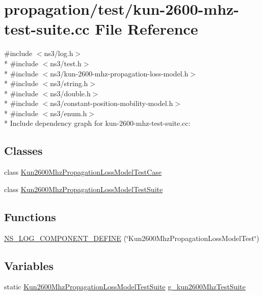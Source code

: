 \hypertarget{kun-2600-mhz-test-suite_8cc}{}\section{propagation/test/kun-\/2600-\/mhz-\/test-\/suite.cc File Reference}
\label{kun-2600-mhz-test-suite_8cc}
{\ttfamily \#include $<$ns3/log.\+h$>$}\\*
{\ttfamily \#include $<$ns3/test.\+h$>$}\\*
{\ttfamily \#include $<$ns3/kun-\/2600-\/mhz-\/propagation-\/loss-\/model.\+h$>$}\\*
{\ttfamily \#include $<$ns3/string.\+h$>$}\\*
{\ttfamily \#include $<$ns3/double.\+h$>$}\\*
{\ttfamily \#include $<$ns3/constant-\/position-\/mobility-\/model.\+h$>$}\\*
{\ttfamily \#include $<$ns3/enum.\+h$>$}\\*
Include dependency graph for kun-\/2600-\/mhz-\/test-\/suite.cc\+:
\subsection*{Classes}
\begin{DoxyCompactItemize}
\item 
class \hyperlink{classKun2600MhzPropagationLossModelTestCase}{Kun2600\+Mhz\+Propagation\+Loss\+Model\+Test\+Case}
\item 
class \hyperlink{classKun2600MhzPropagationLossModelTestSuite}{Kun2600\+Mhz\+Propagation\+Loss\+Model\+Test\+Suite}
\end{DoxyCompactItemize}
\subsection*{Functions}
\begin{DoxyCompactItemize}
\item 
\hyperlink{kun-2600-mhz-test-suite_8cc_a879061024d2d170037f0e788970a16c8}{N\+S\+\_\+\+L\+O\+G\+\_\+\+C\+O\+M\+P\+O\+N\+E\+N\+T\+\_\+\+D\+E\+F\+I\+NE} (\char`\"{}Kun2600\+Mhz\+Propagation\+Loss\+Model\+Test\char`\"{})
\end{DoxyCompactItemize}
\subsection*{Variables}
\begin{DoxyCompactItemize}
\item 
static \hyperlink{classKun2600MhzPropagationLossModelTestSuite}{Kun2600\+Mhz\+Propagation\+Loss\+Model\+Test\+Suite} \hyperlink{kun-2600-mhz-test-suite_8cc_a3e706234eec0aee57332e68b4dfcc5aa}{g\+\_\+kun2600\+Mhz\+Test\+Suite}
\end{DoxyCompactItemize}


